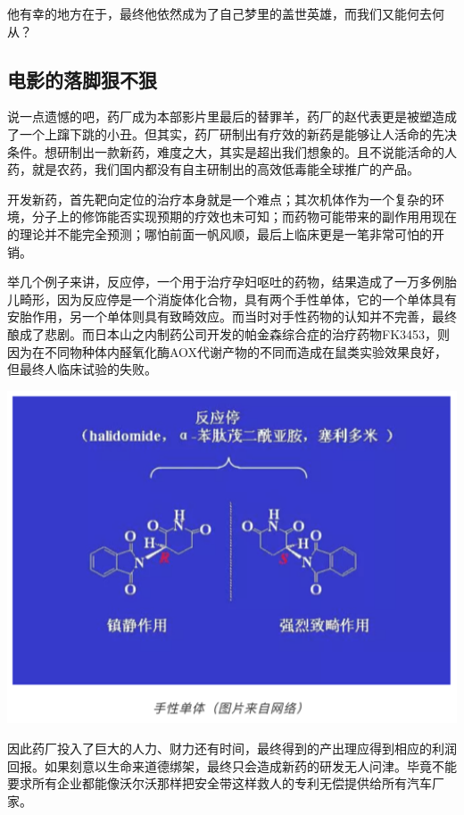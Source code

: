 \documentclass[]{book}
\begin{document}
他有幸的地方在于，最终他依然成为了自己梦里的盖世英雄，而我们又能何去何从？

\subsection{电影的落脚狠不狠}

说一点遗憾的吧，药厂成为本部影片里最后的替罪羊，药厂的赵代表更是被塑造成了一个上蹿下跳的小丑。但其实，药厂研制出有疗效的新药是能够让人活命的先决条件。想研制出一款新药，难度之大，其实是超出我们想象的。且不说能活命的人药，就是农药，我们国内都没有自主研制出的高效低毒能全球推广的产品。

开发新药，首先靶向定位的治疗本身就是一个难点；其次机体作为一个复杂的环境，分子上的修饰能否实现预期的疗效也未可知；而药物可能带来的副作用用现在的理论并不能完全预测；哪怕前面一帆风顺，最后上临床更是一笔非常可怕的开销。

举几个例子来讲，反应停，一个用于治疗孕妇呕吐的药物，结果造成了一万多例胎儿畸形，因为反应停是一个消旋体化合物，具有两个手性单体，它的一个单体具有安胎作用，另一个单体则具有致畸效应。而当时对手性药物的认知并不完善，最终酿成了悲剧。而日本山之内制药公司开发的帕金森综合症的治疗药物FK3453，则因为在不同物种体内醛氧化酶AOX代谢产物的不同而造成在鼠类实验效果良好，但最终人临床试验的失败。

\includegraphics[width=6.67in]{images/yaoshen2}

因此药厂投入了巨大的人力、财力还有时间，最终得到的产出理应得到相应的利润回报。如果刻意以生命来道德绑架，最终只会造成新药的研发无人问津。毕竟不能要求所有企业都能像沃尔沃那样把安全带这样救人的专利无偿提供给所有汽车厂家。
\end{document}
